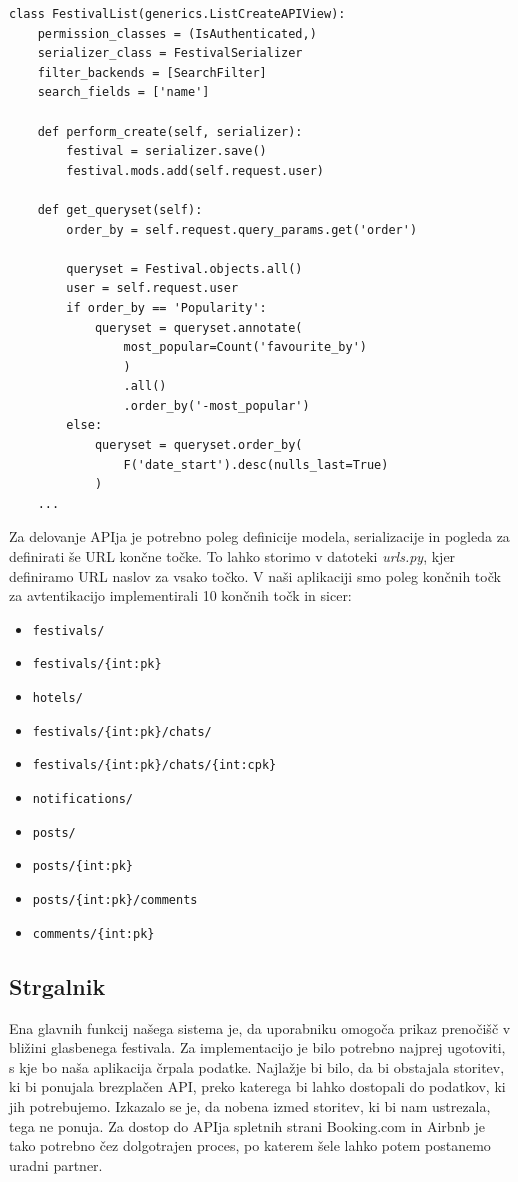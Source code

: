\documentclass[a4paper,12pt,openright]{book}
\begin{document}
\begin{lstlisting}[label=code3,caption=Primer pogleda za model \textit{Festival}\, ki omogoča kreiranje\, iskanje in vračanje festivalov urejenih po popularnosti in datumu.,frame=tb,captionpos=b]
class FestivalList(generics.ListCreateAPIView):
    permission_classes = (IsAuthenticated,)
    serializer_class = FestivalSerializer
    filter_backends = [SearchFilter]
    search_fields = ['name']

    def perform_create(self, serializer):
        festival = serializer.save()
        festival.mods.add(self.request.user)

    def get_queryset(self):
        order_by = self.request.query_params.get('order')

        queryset = Festival.objects.all()
        user = self.request.user
        if order_by == 'Popularity':
            queryset = queryset.annotate(
                most_popular=Count('favourite_by')
                )
                .all()
                .order_by('-most_popular')
        else:
            queryset = queryset.order_by(
                F('date_start').desc(nulls_last=True)
            )
    ...
\end{lstlisting}

Za delovanje APIja je potrebno poleg definicije modela, serializacije in pogleda za definirati še URL končne točke.
To lahko storimo v datoteki \textit{urls.py}, kjer definiramo URL naslov za vsako točko.
V naši aplikaciji smo poleg končnih točk za avtentikacijo implementirali 10 končnih točk in sicer:
\begin{itemize}
    \item \texttt{festivals/}
    \item \texttt{festivals/\{int:pk\}}
    \item \texttt{hotels/}
    \item \texttt{festivals/\{int:pk\}/chats/}
    \item \texttt{festivals/\{int:pk\}/chats/\{int:cpk\}}
    \item \texttt{notifications/}
    \item \texttt{posts/}
    \item \texttt{posts/\{int:pk\}}
    \item \texttt{posts/\{int:pk\}/comments}
    \item \texttt{comments/\{int:pk\}}
\end{itemize}

\subsection{Strgalnik}
Ena glavnih funkcij našega sistema je, da uporabniku omogoča prikaz preno\-čišč v bližini glasbenega festivala.
Za implementacijo je bilo potrebno najprej ugotoviti, s kje bo naša aplikacija črpala podatke.
Najlažje bi bilo, da bi obstajala storitev, ki bi ponujala brezplačen API, preko katerega bi lahko dostopali do podatkov, ki jih potrebujemo.
Izkazalo se je, da nobena izmed storitev, ki bi nam ustrezala, tega ne ponuja.
Za dostop do APIja spletnih strani Booking.com in Airbnb je tako potrebno čez dolgotrajen proces, po katerem šele lahko potem postanemo uradni partner.
\end{document}

